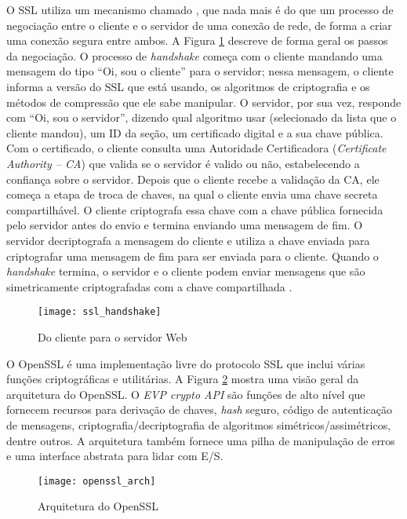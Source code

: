 O SSL utiliza um mecanismo chamado , que
nada mais é do que um processo de negociação entre o cliente e o servidor de uma conexão de rede, de
forma a criar uma conexão segura entre ambos. A Figura
\ref{fig:openssl_handshake} descreve de forma geral os passos da negociação. O
processo de \emph{handshake} começa com o cliente mandando uma mensagem do
tipo ``Oi, sou o cliente'' para o servidor; nessa mensagem, o cliente informa a
versão do SSL que está usando, os algoritmos de criptografia e os métodos de
compressão que ele sabe manipular. O servidor, por sua vez, responde com ``Oi, sou o
servidor'', dizendo qual algoritmo usar (selecionado da lista que o cliente
mandou), um ID da seção, um certificado digital e a sua chave pública. Com o
certificado, o cliente consulta uma Autoridade Certificadora (\emph{Certificate Authority -- CA})
que valida se o servidor é valido ou não,
estabelecendo a confiança sobre o servidor. Depois que o cliente recebe a
validação da CA, ele começa a etapa de troca de chaves, na qual o cliente envia
uma chave secreta compartilhável. O cliente criptografa essa chave com a chave
pública fornecida pelo servidor antes do envio e termina enviando uma mensagem de
fim. O servidor decriptografa a mensagem do cliente e utiliza a chave enviada
para criptografar uma mensagem de fim para ser enviada para o cliente. Quando
o \emph{handshake} termina, o servidor e o cliente podem enviar mensagens que
são simetricamente criptografadas com a chave compartilhada \citep{openssl}.

\begin{figure}[!h]
  \centering
  \texttt{[image: ssl\_handshake]}
  \caption{Do cliente para o servidor Web}
  \label{fig:openssl_handshake}
\end{figure}

O OpenSSL é uma implementação livre do protocolo SSL que
inclui várias funções criptográficas e utilitárias. A Figura
\ref{fig:openssl_arch} mostra uma visão geral da arquitetura do OpenSSL. O
\emph{EVP crypto API} são funções de alto nível que fornecem recursos para
derivação de chaves, \emph{hash} seguro, código de autenticação de mensagens,
criptografia/decriptografia de algoritmos simétricos/assimétricos, dentre outros. A
arquitetura também fornece uma pilha de manipulação de erros e uma interface
abstrata para lidar com E/S.

\begin{figure}[!h]
  \centering
  \texttt{[image: openssl\_arch]}
  \caption[Arquitetura do OpenSSL]{Arquitetura do OpenSSL \citep{crypto_openssl}}
  \label{fig:openssl_arch}
\end{figure}

